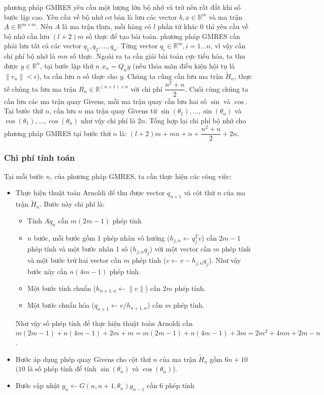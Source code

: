 \documentclass[14pt, a4paper]{article}
\numberwithin{equation}{section}
\numberwithin{algorithm}{section}
\numberwithin{figure}{section}
\numberwithin{dl}{section}
\numberwithin{md}{section}
\numberwithin{bd}{section}
\numberwithin{dn}{section}
\begin{document}
phương pháp GMRES yêu cầu một lượng lớn bộ nhớ và trở nên rất đắt khi số bước lặp cao.
Yêu cầu về bộ nhớ cơ bản là lưu các vector $b, x \in \mathbb{R}^{m}$ và ma trận $A \in \mathbb{R}^{m \times m}$. Nếu $A$ là ma trận thưa, mỗi hàng có $l$ phần tử khác 0 thì yêu cầu về bộ nhớ cần lưu $(l+2)m$ số thực để tạo bài toán. phương pháp GMRES cần phải lưu tất cả các vector $q_1, q_2, \dots, q_n$. Từng vector $q_i \in \mathbb{R}^{m}, i=1\dots n$, vì vậy cần chi phí bộ nhớ là $mn$ số thực.
Ngoài ra ta cần giải bài toán cực tiểu hóa, ta thu được $y \in \mathbb{R}^n$, tại bước lặp thứ $n$ $x_n = Q_n y$ (nếu thỏa mãn điều kiện hội tụ là $\lVert r_n \rVert < \epsilon$), ta cần lưu $n$ số thực cho $y$.
Chúng ta cũng cần lưu ma trận $\widetilde{H}_n$, thực tế chúng ta lưu ma trận $R_n \in \mathbb{R}^{(n+1) \times n}$ với chi phí $\dfrac{n^2 + n}{2}$.
Cuối cùng chúng ta cần lưu các ma trận quay Givens, mỗi ma trận quay cần lưu hai số $\sin$ và $\cos$. Tại bước thứ $n$, cần lưu $n$ ma trận quay Givens từ $\sin(\theta_1),\dots, \sin(\theta_n)$ và $\cos(\theta_1),\dots,\cos(\theta_n)$ như vậy chi phí là $2n$.
Tổng hợp lại chi phí bộ nhớ cho phương pháp GMRES tại bước thứ $n$ là: $(l+2)m + mn + n + \dfrac{n^2 + n}{2} + 2n$.

\subsubsection{Chi phí tính toán} \label{GMRES-Computation-Cost}

Tại mỗi bước $n$, của phương pháp GMRES, ta cần thực hiện các công việc:

\begin{itemize}
    \item Thực hiện thuật toán Arnoldi để thu được vector $q_{n+1}$ và cột thứ $n$ của ma trận $\widetilde{H}_n$. Bước này chi phí là: \begin{itemize}
        \item Tính $Aq_n$ cần $m(2m-1)$ phép tính
        \item $n$ bước, mỗi bước gồm 1 phép nhân vô hướng ($h_{j,n} \leftarrow q_j^Tv$) cần $2m-1$ phép tính và một bước nhân 1 số ($h_{j,n}q_j$) với một vector cần $m$ phép tính và một bước trừ hai vector cần $m$ phép tính ($v \leftarrow v - h_{j,n}q_j$). Như vậy bước này cần $n(4m-1)$ phép tính.
        \item Một bước tính chuẩn ($h_{n+1,n} \leftarrow \lVert v \rVert$) cần $2m$ phép tính.
        \item Một bước chuẩn hóa ($q_{n+1} \leftarrow v/h_{n+1,n}$) cần $m$ phép tính.
    \end{itemize}
    Như vậy số phép tính để thực hiện thuật toán Arnoldi cần $m(2m-1) + n(4m-1) + 2m + m=m(2m-1) + n(4m-1)+ 3m=2m^2+4mn+2m-n$.
    \item Bước áp dụng phép quay Givens cho cột thứ $n$ của ma trận $\widetilde{H}_n$ gồm $6n+10$ ($10$ là số phép tính để tính $\sin(\theta_n)$ và $\cos(\theta_n)$).
    \item Bước cập nhật $g_n \leftarrow G(n, n+1, \theta_n)g_{n-1}$ cần 6 phép tính
\end{itemize}
\end{document}
